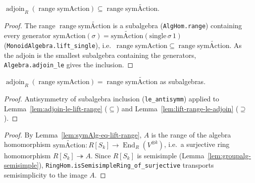 \begin{lemma}
    \label{lem:adjoin-le-lift-range}
    $\operatorname{adjoin}_R(\operatorname{range}\mathrm{symAction})
      \subseteq \operatorname{range}\widetilde{\mathrm{symAction}}$.
\end{lemma}
\begin{proof}
    The range $\operatorname{range}\widetilde{\mathrm{symAction}}$ is a subalgebra
    (\texttt{AlgHom.range}) containing every generator $\mathrm{symAction}(\sigma) =
    \widetilde{\mathrm{symAction}}(\mathrm{single}\,\sigma\,1)$
    (\texttt{MonoidAlgebra.lift\_single}), i.e.\ $\operatorname{range}\mathrm{symAction}
      \subseteq \operatorname{range}\widetilde{\mathrm{symAction}}$. As the adjoin is the smallest
    subalgebra containing the generators, \texttt{Algebra.adjoin\_le} gives the inclusion.
\end{proof}

\begin{lemma}
    \label{lem:symAlg-eq-lift-range}
    \leanok
    $\operatorname{adjoin}_R(\operatorname{range}\mathrm{symAction})
      = \operatorname{range}\widetilde{\mathrm{symAction}}$ as subalgebras.
\end{lemma}
\begin{proof}
    Antisymmetry of subalgebra inclusion (\texttt{le\_antisymm}) applied to
    Lemma~\ref{lem:adjoin-le-lift-range} ($\subseteq$) and Lemma~\ref{lem:lift-range-le-adjoin}
    ($\supseteq$).
\end{proof}

\begin{proof}
    By Lemma~\ref{lem:symAlg-eq-lift-range}, $A$ is the range of the algebra homomorphism
    $ : R[S_k] \to {}_R(V^{\otimes k})$, i.e.\ a
    surjective ring homomorphism $R[S_k] \twoheadrightarrow A$. Since $R[S_k]$ is semisimple
    (Lemma~\ref{lem:groupalg-semisimple}), \texttt{RingHom.isSemisimpleRing\_of\_surjective}
    transports semisimplicity to the image $A$.
\end{proof}

